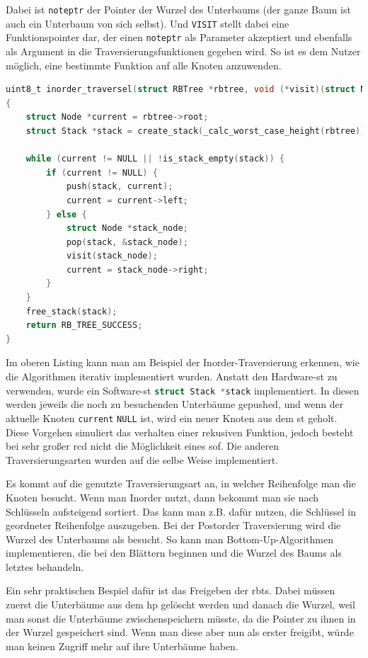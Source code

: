 \documentclass[11pt]{article}
\newcommand{\lstin}[1]{\lstinline[language=C]{#1}}
\begin{document}
Dabei ist \lstin{noteptr} der Pointer der Wurzel des Unterbaums (der ganze Baum ist auch ein Unterbaum von sich selbst). Und \lstin{VISIT} stellt dabei eine Funktionspointer dar, der einen \lstin{noteptr} als Parameter akzeptiert und ebenfalls als Argument in die Traversierungsfunktionen gegeben wird.
So ist es dem Nutzer möglich, eine bestimmte Funktion auf alle Knoten anzuwenden.

\begin{lstlisting}[language=C]
uint8_t inorder_traversel(struct RBTree *rbtree, void (*visit)(struct Node*))
{
    struct Node *current = rbtree->root;
    struct Stack *stack = create_stack(_calc_worst_case_height(rbtree));

    while (current != NULL || !is_stack_empty(stack)) {
        if (current != NULL) {
            push(stack, current);
            current = current->left;
        } else {
            struct Node *stack_node;
            pop(stack, &stack_node);
            visit(stack_node);
            current = stack_node->right;
        }
    }
    free_stack(stack);
    return RB_TREE_SUCCESS;
}
\end{lstlisting}

Im oberen Listing kann man am Beispiel der Inorder-Traversierung erkennen, wie die Algorithmen iterativ implementiert wurden. Anstatt den Hardware-\gls{st} zu verwenden, wurde ein Software-\gls{st} \lstin{struct Stack *stack} implementiert.
In diesen werden jeweils die noch zu besuchenden Unterbäume gepushed, und wenn der aktuelle Knoten \lstin{current} \lstin{NULL} ist, wird ein neuer Knoten aus dem \gls{st} geholt.
Diese Vorgehen simuliert das verhalten einer rekusiven Funktion, jedoch besteht bei sehr großer \gls{rcd} nicht die Möglichkeit eines \gls{sof}. Die anderen Traversierungsarten wurden auf die selbe Weise implementiert.

Es kommt auf die genutzte Traversierungsart an, in welcher Reihenfolge man die Knoten besucht. Wenn man Inorder nutzt, dann bekommt man sie nach Schlüsseln aufsteigend sortiert. Das kann man z.B. dafür nutzen, die Schlüssel in geordneter Reihenfolge auszugeben.
Bei der Postorder Traversierung wird die Wurzel des Unterbaums als besucht. So kann man Bottom-Up-Algorithmen implementieren, die bei den Blättern beginnen und die Wurzel des Baums als letztes behandeln.

Ein sehr praktischen Bespiel dafür ist das Freigeben der \glspl{rbt}. Dabei müssen zuerst die Unterbäume aus dem \gls{hp} gelöscht werden und danach die Wurzel, weil man sonst die Unterbäume zwischenspeichern müsste, da die Pointer zu ihnen in der Wurzel gespeichert sind.
Wenn man diese aber nun als erster freigibt, würde man keinen Zugriff mehr auf ihre Unterbäume haben.
\end{document}
